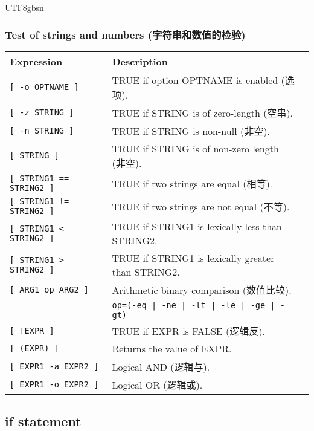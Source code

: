 \documentclass[red]{beamer}
\newcommand*{\lstverb}{\lstinline[style=caret]}
\begin{document}
\begin{CJK*}{UTF8}{gbsn}
\begin{frame}
\frametitle{Test of strings and numbers (字符串和数值的检验)}
\begin{table}[ht]
\tiny
\renewcommand\arraystretch{1.2}
\begin{tabular}{lll}
\hline
\textbf{Expression} & \textbf{Description}\\
\hline
\lstverb|[ -o OPTNAME ]| & TRUE if option OPTNAME is enabled (选项).\\
\lstverb|[ -z STRING ]| & TRUE if STRING is of zero-length (空串).\\
\lstverb|[ -n STRING ]| & TRUE if STRING is non-null (非空).\\
\lstverb|[ STRING ]| & TRUE if STRING is of non-zero length (非空).\\
\lstverb|[ STRING1 == STRING2 ]| & TRUE if two strings are equal (相等).\\
\lstverb|[ STRING1 != STRING2 ]| & TRUE if two strings are not equal (不等).\\
\lstverb|[ STRING1 < STRING2 ]| & TRUE if STRING1 is lexically less than STRING2.\\
\lstverb|[ STRING1 > STRING2 ]| & TRUE if STRING1 is lexically greater than STRING2.\\
\lstverb|[ ARG1 op ARG2 ]| & Arithmetic binary comparison (数值比较).\\
& \texttt{op=(-eq | -ne | -lt | -le | -ge | -gt)}\\
\lstverb|[ !EXPR ]| & TRUE if EXPR is FALSE (逻辑反).\\
\lstverb|[ (EXPR) ]| & Returns the value of EXPR.\\
\lstverb|[ EXPR1 -a EXPR2 ]| & Logical AND (逻辑与).\\
\lstverb|[ EXPR1 -o EXPR2 ]| & Logical OR (逻辑或).\\
\hline
\end{tabular}
\end{table}
\end{frame}

\subsection{if statement}


\end{CJK*}
\end{document}
